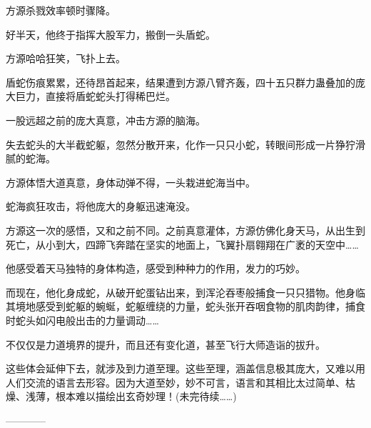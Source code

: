 \begin{this_body}
方源杀戮效率顿时骤降。

好半天，他终于指挥大股军力，搬倒一头盾蛇。

方源哈哈狂笑，飞扑上去。

盾蛇伤痕累累，还待昂首起来，结果遭到方源八臂齐轰，四十五只群力蛊叠加的庞大巨力，直接将盾蛇蛇头打得稀巴烂。

一股远超之前的庞大真意，冲击方源的脑海。

失去蛇头的大半截蛇躯，忽然分散开来，化作一只只小蛇，转眼间形成一片狰狞滑腻的蛇海。

方源体悟大道真意，身体动弹不得，一头栽进蛇海当中。

蛇海疯狂攻击，将他庞大的身躯迅速淹没。

方源这一次的感悟，又和之前不同。之前真意灌体，方源仿佛化身天马，从出生到死亡，从小到大，四蹄飞奔踏在坚实的地面上，飞翼扑扇翱翔在广袤的天空中……

他感受着天马独特的身体构造，感受到种种力的作用，发力的巧妙。

而现在，他化身成蛇，从破开蛇蛋钻出来，到浑沦吞枣般捕食一只只猎物。他身临其境地感受到蛇躯的蜿蜒，蛇躯缠绕的力量，蛇头张开吞咽食物的肌肉韵律，捕食时蛇头如闪电般出击的力量调动……

不仅仅是力道境界的提升，而且还有变化道，甚至飞行大师造诣的拔升。

这些体会延伸下去，就涉及到力道至理。这些至理，涵盖信息极其庞大，又难以用人们交流的语言去形容。因为大道至妙，妙不可言，语言和其相比太过简单、枯燥、浅薄，根本难以描绘出玄奇妙理！(未完待续……)

------------

\end{this_body}

